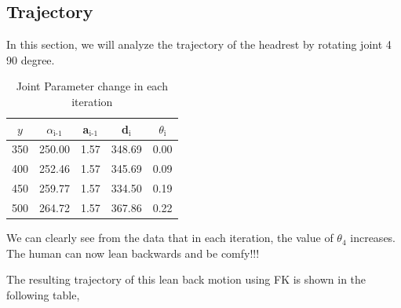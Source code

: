 \documentclass[12pt, letterpaper]{amsart} %
\numberwithin{equation}{section}
\begin{document}
\subsection{Trajectory}
In this section, we will analyze the trajectory of the headrest by rotating joint 4 90 degree.


\begin{table}[H]
  \centering
  \begin{tabular}{c|cccc}
$y$ & $\alpha$$_{\text{i-1}}$ & a$_{\text{i-1}}$ & d$_{\text{i}}$ & $\theta$$_{\text{i}}$\\
\hline
350 & 250.00 & 1.57 & 348.69 & 0.00\\
400 & 252.46 & 1.57 & 345.69 & 0.09\\
450 & 259.77 & 1.57 & 334.50 & 0.19\\
500 & 264.72 & 1.57 & 367.86 & 0.22\\
\end{tabular}
  \caption{Joint Parameter change in each iteration}
\end{table}
We can clearly see from the data that in each iteration, the value of $\theta_4$ increases. The human can now lean backwards and be comfy!!! \par
The resulting trajectory of this lean back motion using FK is shown in the following table,
\end{document}

